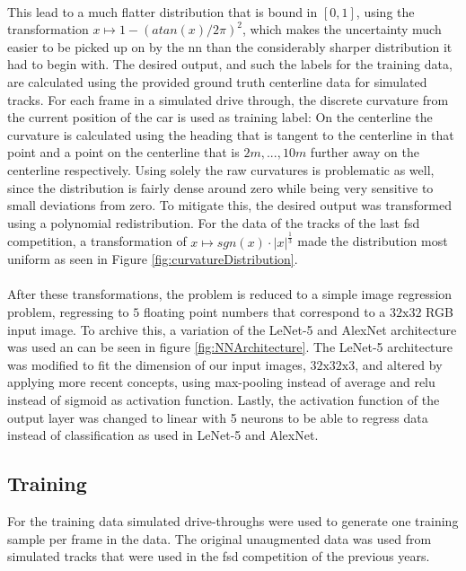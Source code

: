 \\This lead to a much flatter distribution that is bound in $[0,1]$, using the transformation $x \mapsto 1-(atan(x)/2\pi)^2$, which makes the uncertainty much easier to be picked up on by the \ac{nn} \cite{Sola1997} than the considerably sharper distribution it had to begin with. 
The desired output, and such the labels for the training data, are calculated using the provided ground truth centerline data for simulated tracks. For each frame in a simulated drive through, the discrete curvature from the current position of the car is used as training label: On the centerline the curvature is calculated using the heading that is tangent to the centerline in that point and a point on the centerline that is $2m, ..., 10m$ further away on the centerline respectively. Using solely the raw curvatures is problematic as well, since the distribution is fairly dense around zero while being very sensitive to small deviations from zero. To mitigate this, the desired output was transformed using a polynomial redistribution. For the data of the tracks of the last \ac{fsd} competition, a transformation of $x \mapsto sgn(x)\cdot |x|^\frac{1}{3}$ made the distribution most uniform as seen in Figure \ref{fig:curvatureDistribution}.
\\
\\
After these transformations, the problem is reduced to a simple image regression problem, regressing to $5$ floating point numbers that correspond to a $32\text{x}32$ RGB input image. To archive this, a variation of the LeNet-5 \cite{Lecun1998} and AlexNet \cite{Alex2012} architecture was used an can be seen in figure \ref{fig:NNArchitecture}. The LeNet-5 architecture was modified to fit the dimension of our input images, $32\text{x}32\text{x}3$, and altered by applying more recent concepts, using max-pooling instead of average and \ac{relu} instead of sigmoid as activation function. Lastly, the activation function of the output layer was changed to linear with 5 neurons to be able to regress data instead of classification as used in LeNet-5 and AlexNet. 
\subsection{Training}
For the training data simulated drive-throughs were used to generate one training sample per frame in the data. The original unaugmented data was used
from simulated tracks that were used in the \ac{fsd} competition of the previous years.